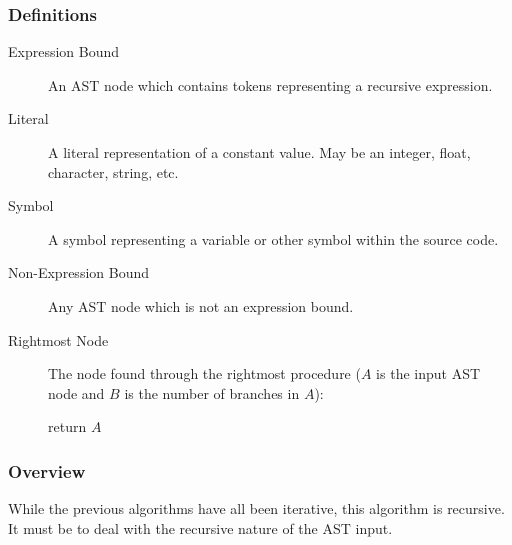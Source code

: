 \documentclass[10pt,a4paper]{article}
\begin{document}
\subsubsection{Definitions}
\begin{description}
\item[Expression Bound] An AST node which contains tokens representing a recursive expression.
\item[Literal] A literal representation of a constant value. May be an integer, float, character, string, etc.
\item[Symbol] A symbol representing a variable or other symbol within the source code.
\item[Non-Expression Bound] Any AST node which is not an expression bound.
\item[Rightmost Node] The node found through the rightmost procedure ($A$ is the input AST node and $B$ is the number of branches in $A$):\newline
	\begin{algorithm}[H]
	\caption{$rightmost(A)$}

	 {
		return $A$\;
	}
	\end{algorithm}
\end{description}

\subsubsection{Overview}
While the previous algorithms have all been iterative, this algorithm is recursive. It must be to deal with the recursive nature of the AST input.
\end{document}
